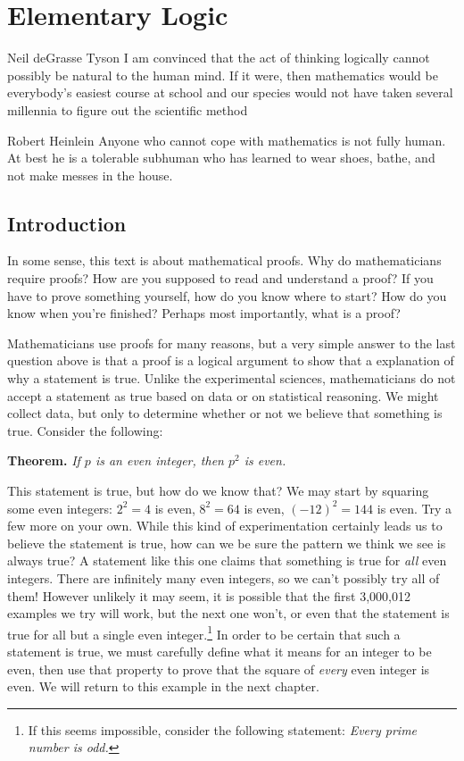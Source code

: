\chapter{Elementary Logic}

\begin{chapqt}{Neil deGrasse Tyson}
I am convinced that the act of thinking logically cannot possibly be natural to the human mind. If it were, then mathematics would be everybody's easiest course at school and our species would not have taken several millennia to figure out the scientific method
\end{chapqt}

\begin{chapqt}{Robert Heinlein}
Anyone who cannot cope with mathematics is not fully human. At best he is a tolerable subhuman who has learned to wear shoes, bathe, and not make messes in the house.
\end{chapqt}

\section*{Introduction}

In some sense, this text is about mathematical proofs. Why do mathematicians require proofs? How are you supposed to read and understand a proof?  If you have to prove something yourself, how do you know where to start?  How do you know when you're finished? Perhaps most importantly, what is a proof?

Mathematicians use proofs for many reasons, but a very simple answer to the last question above is that a proof is a logical argument to show that a explanation of why a statement is true.  Unlike the experimental sciences, mathematicians do not accept a statement as true based on data or on statistical reasoning.  We might collect data, but only to determine whether or not we believe that something is true.  Consider the following:

\medbreak\noindent
{\bf Theorem.} \emph{If $p$ is an even integer, then $p^2$ is even.}
\medbreak

This statement is true, but how do we know that?  We may start by squaring some even integers: $2^2=4$ is even, $8^2=64$ is even, $(-12)^2=144$ is even. Try a few more on your own. While this kind of experimentation certainly leads us to believe the statement is true, how can we be sure the pattern we think we see is always true? A statement like this one claims that something is true for \emph{all} even integers. There are infinitely many even integers, so we can't possibly try all of them! However unlikely it may seem, it is possible that the first 3,000,012 examples we try will work, but the next one won't, or even that the statement is true for all but a single even integer.\footnote{If this seems impossible, consider the following statement: \emph{Every prime number is odd.}} In order to be certain that such a statement is true, we must carefully define what it means for an integer to be even, then use that property to prove that the square of \emph{every} even integer is even. We will return to this example in the next chapter.

